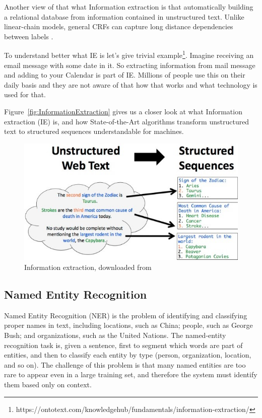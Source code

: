 \documentclass[thesis=M,english]{FITthesis}[2018/05/30]
\begin{document}
	Another view of that what Information extraction is that automatically building a relational database from information contained in unstructured text. Unlike linear-chain models, general CRFs can capture long distance dependencies between labels \cite{article:IE}.

	To understand better what IE is let's give trivial example\footnote{https://ontotext.com/knowledgehub/fundamentals/information-extraction/}. Imagine receiving an email message with some date in it. So extracting information from mail message and adding to your Calendar is part of IE. Millions of people use this on their daily basis and they are not aware of that how that works and what technology is used for that.

	Figure~\ref{fig:InformationExtraction} gives us a closer look at what Information extraction (IE) is, and how State-of-the-Art algorithms transform unstructured text to structured sequences understandable for machines. 

	\begin{figure}[H]\centering
		\includegraphics[width=\textwidth]{information-extraction}
		\caption[Information extraction example]{Information extraction, downloaded from\footnotemark}
	\end{figure}


\subsection{Named Entity Recognition}\label{NER subsection}
Named Entity Recognition (NER) \cite{article:NER} is the problem of identifying and classifying proper names in text, including locations, such as China; people, such as George Bush; and organizations, such as the United Nations. The named-entity recognition task is, given a sentence, first to segment which words are part of entities, and then to classify each entity by type (person, organization, location, and so on). The challenge of this problem is that many named entities are too rare to appear even in a large training set, and therefore the system must identify them based only on context.
\end{document}
